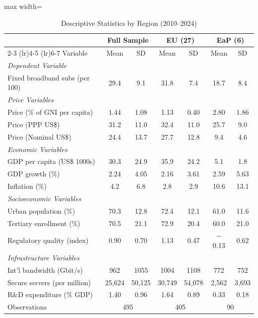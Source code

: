 \begin{table}[htbp]
\centering
\caption{Descriptive Statistics by Region (2010--2024)}
\label{tab:descriptives}
\begin{threeparttable}
\begin{adjustbox}{max width=\textwidth}
\scriptsize
\begin{tabular}{lcccccc}
\toprule
& \multicolumn{2}{c}{Full Sample} & \multicolumn{2}{c}{EU (27)} & \multicolumn{2}{c}{EaP (6)} \\
\cmidrule(lr){2-3} \cmidrule(lr){4-5} \cmidrule(lr){6-7}
Variable & Mean & SD & Mean & SD & Mean & SD \\
\midrule
\textit{Dependent Variable} \\
Fixed broadband subs (per 100) & 29.4 & 9.1 & 31.8 & 7.4 & 18.7 & 8.4 \\
\addlinespace
\textit{Price Variables} \\
Price (\% of GNI per capita) & 1.44 & 1.08 & 1.13 & 0.40 & 2.80 & 1.86 \\
Price (PPP US\$) & 31.2 & 11.0 & 32.4 & 11.0 & 25.7 & 9.0 \\
Price (Nominal US\$) & 24.4 & 13.7 & 27.7 & 12.8 & 9.4 & 4.6 \\
\addlinespace
\textit{Economic Variables} \\
GDP per capita (US\$ 1000s) & 30.3 & 24.9 & 35.9 & 24.2 & 5.1 & 1.8 \\
GDP growth (\%) & 2.24 & 4.05 & 2.16 & 3.61 & 2.59 & 5.63 \\
Inflation (\%) & 4.2 & 6.8 & 2.8 & 2.9 & 10.6 & 13.1 \\
\addlinespace
\textit{Socioeconomic Variables} \\
Urban population (\%) & 70.3 & 12.8 & 72.4 & 12.1 & 61.0 & 11.6 \\
Tertiary enrollment (\%) & 70.5 & 21.1 & 72.9 & 20.4 & 60.0 & 21.0 \\
Regulatory quality (index) & 0.90 & 0.70 & 1.13 & 0.47 & $-$0.13 & 0.62 \\
\addlinespace
\textit{Infrastructure Variables} \\
Int'l bandwidth (Gbit/s) & 962 & 1055 & 1004 & 1108 & 772 & 752 \\
Secure servers (per million) & 25{,}624 & 50{,}125 & 30{,}749 & 54{,}078 & 2{,}562 & 3{,}693 \\
R\&D expenditure (\% GDP) & 1.40 & 0.96 & 1.64 & 0.89 & 0.33 & 0.18 \\
\midrule
Observations & \multicolumn{2}{c}{495} & \multicolumn{2}{c}{405} & \multicolumn{2}{c}{90} \\

\end{tabular}
\end{adjustbox}
\end{threeparttable}
\end{table}
